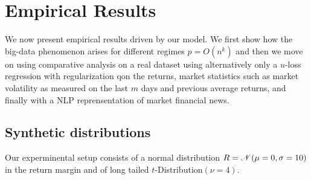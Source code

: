 \section{Empirical Results}

We now present empirical results driven by our model. We first show how the big-data
phenomenon arises for different regimes $p=O(n^k)$ and then we move on using comparative
analysis on a real dataset using alternatively only a $u$-loss regression with
regularization qon the returns, market statistics such as market volatility as measured on
the last $m$ days and previous average returns, and finally with a NLP reprensentation of
market financial news.


\subsection{Synthetic distributions}

Our experminental setup consists of a normal distribution $R=\mathscr{N}(\mu=0,\sigma=10)$
in the return margin and of long tailed $t$-Distribution$(\nu=4)$.


